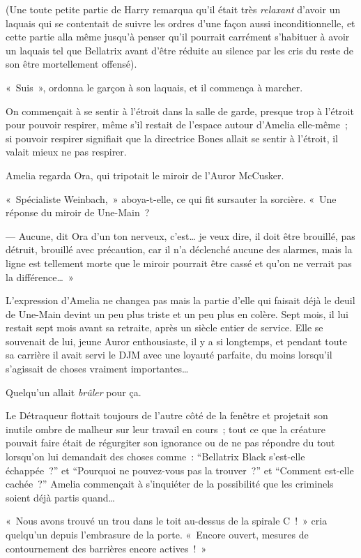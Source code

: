 (Une toute petite partie de Harry remarqua qu'il était très \emph{relaxant} d'avoir un laquais qui se contentait de suivre les ordres d'une façon aussi inconditionnelle, et cette partie alla même jusqu'à penser qu'il pourrait carrément s'habituer à avoir un laquais tel que Bellatrix avant d'être réduite au silence par les cris du reste de son être mortellement offensé).

«~Suis~», ordonna le garçon à son laquais, et il commença à marcher.

\later

On commençait à se sentir à l'étroit dans la salle de garde, presque trop à l'étroit pour pouvoir respirer, même s'il restait de l'espace autour d'Amelia elle-même~; si pouvoir respirer signifiait que la directrice Bones allait se sentir à l'étroit, il valait mieux ne pas respirer.

Amelia regarda Ora, qui tripotait le miroir de l'Auror McCusker.

«~Spécialiste Weinbach,~» aboya-t-elle, ce qui fit sursauter la sorcière. «~Une réponse du miroir de Une-Main~?

--- Aucune, dit Ora d'un ton nerveux, c'est… je veux dire, il doit être brouillé, pas détruit, brouillé avec précaution, car il n'a déclenché aucune des alarmes, mais la ligne est tellement morte que le miroir pourrait être cassé et qu'on ne verrait pas la différence…~»

L'expression d'Amelia ne changea pas mais la partie d'elle qui faisait déjà le deuil de Une-Main devint un peu plus triste et un peu plus en colère. Sept mois, il lui restait sept mois avant sa retraite, après un siècle entier de service. Elle se souvenait de lui, jeune Auror enthousiaste, il y a si longtemps, et pendant toute sa carrière il avait servi le DJM avec une loyauté parfaite, du moins lorsqu'il s'agissait de choses vraiment importantes…

Quelqu'un allait \emph{brûler} pour ça.

Le Détraqueur flottait toujours de l'autre côté de la fenêtre et projetait son inutile ombre de malheur sur leur travail en cours~; tout ce que la créature pouvait faire était de régurgiter son ignorance ou de ne pas répondre du tout lorsqu'on lui demandait des choses comme~: “Bellatrix Black s'est-elle échappée~?” et “Pourquoi ne pouvez-vous pas la trouver~?” et “Comment est-elle cachée~?” Amelia commençait à s'inquiéter de la possibilité que les criminels soient déjà partis quand…

«~Nous avons trouvé un trou dans le toit au-dessus de la spirale C~!~» cria quelqu'un depuis l'embrasure de la porte. «~Encore ouvert, mesures de contournement des barrières encore actives~!~»

